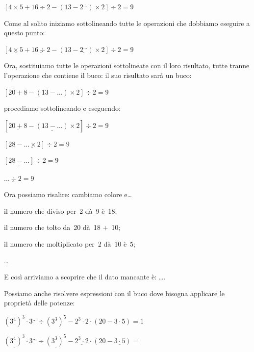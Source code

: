 \begin{exrig}
  \begin{esempio}
  $\left[ 4 \times 5 + 16 \div 2 -
   \left(13 - 2^{\dots} \right) \times 2 \right] \div 2 = 9$
  
  Come al solito iniziamo sottolineando tutte le operazioni che dobbiamo 
  eseguire a questo punto:
  
  $\left[ \underline{4 \times 5} + \underline{16 \div 2} -
   \left(13 - \underline{2^{\dots}} \right) \times 2 \right] \div 2 = 9$
  
  Ora, sostituiamo tutte le operazioni sottolineate con il loro risultato, 
  tutte tranne l'operazione che contiene il buco: il suo risultato sarà un 
  buco:
  
  $\left[ 20 + 8 -
   \left(13 - {\dots} \right) \times 2 \right] \div 2 = 9$
   
  procediamo sottolineando e eseguendo:
  
  $\left[ \underline{20 + 8} -
   \underline{\left(13 - {\dots} \right)} \times 2 \right] \div 2 = 9$
  
  $\left[ 28 - \underline{{\dots} \times 2} \right] \div 2 = 9$
  
  $\underline{\left[ 28 - {\dots} \right]} \div 2 = 9$
  
  $\underline{{\dots} \div 2} = 9$
  
  Ora possiamo risalire: cambiamo colore e\dots
  
  \begin{itemize*}
   \item il numero che diviso per~2 dà~9 è~18;
   \item il numero che tolto da~20 dà~18 +~10;
   \item il numero che moltiplicato per~2 dà~10 è~5;
   \item \dots
  \end{itemize*}

 E così arriviamo a scoprire che il dato mancante è: \dots.
 
 \end{esempio}

 \begin{esempio}

 Possiamo anche risolvere espressioni con il buco dove bisogna
 applicare le proprietà delle potenze:
 
 $\left(3^4 \right)^3 \cdot 3^{\dots} \div \left(3^3 \right)^5 -
  2^{3} \cdot 2 \cdot \left( 20 - 3 \cdot 5 \right) = 1$

 $\underline{\left(3^4 \right)^3} \cdot 
  3^{\dots} \div \underline{\left(3^3 \right)^5} -
  \underline{2^{3} \cdot 2} \cdot 
  \left( 20 - \underline{3 \cdot 5} \right) =$


\end{esempio}
\end{exrig}
